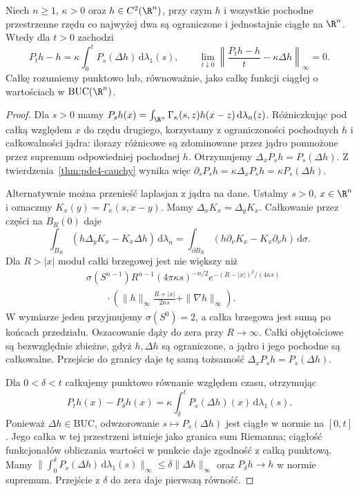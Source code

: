 \begin{lemat}
\label{lem:pde-v31-heat-generator}
Niech $n\geq1$, $\kappa>0$ oraz
$h\in C^2(\R^n)$, przy czym $h$ i wszystkie pochodne
przestrzenne rzędu co najwyżej dwa są ograniczone
i jednostajnie ciągłe na $\R^n$.
Wtedy dla $t>0$ zachodzi
\begin{equation}\label{eq:pde-v31-heat-generator}
 P_th-h=\kappa\int_0^t P_s(\Delta h)\,\mathrm d\lambda_1(s),
 \qquad
 \lim_{t\downarrow0}\left\|\frac{P_th-h}{t}
                 -\kappa\Delta h\right\|_\infty=0.
\end{equation}
Całkę rozumiemy punktowo lub, równoważnie, jako
całkę funkcji ciągłej o wartościach w $\mathrm{BUC}(\R^n)$.
\end{lemat}
\begin{proof}
Dla $s>0$ mamy $P_sh(x)=\int_{\R^n}\Gamma_\kappa(s,z)
h(x-z)\,\mathrm d\lambda_n(z)$. Różniczkując pod
całką względem $x$ do rzędu drugiego, korzystamy
z ograniczoności pochodnych $h$ i całkowalności
jądra: ilorazy różnicowe są zdominowane przez
jądro pomnożone przez supremum odpowiedniej pochodnej $h$.
Otrzymujemy $\Delta_xP_sh=P_s(\Delta h)$.
Z twierdzenia~\ref{thm:pde4-cauchy} wynika więc
$\partial_sP_sh=\kappa\Delta_xP_sh=\kappa P_s(\Delta h)$.

Alternatywnie można przenieść laplasjan z jądra
na dane. Ustalmy $s>0$, $x\in\R^n$ i oznaczmy
$K_x(y)=\Gamma_\kappa(s,x-y)$. Mamy
$\Delta_x K_x=\Delta_y K_x$. Całkowanie przez części
na $B_R(0)$ daje
\[
 \int_{B_R}(h\Delta_y K_x-K_x\Delta h)\,\mathrm d\lambda_n
 =\int_{\partial B_R}(h\partial_\nu K_x-K_x\partial_\nu h)
 \,\mathrm d\sigma.
\]
Dla $R>|x|$ moduł całki brzegowej jest nie większy niż
\[
 \begin{aligned}
 &\sigma(S^{n-1})R^{n-1}(4\pi\kappa s)^{-n/2}
 e^{-(R-|x|)^2/(4\kappa s)}\\
 &\qquad{}\cdot\left(\|h\|_\infty\frac{R+|x|}{2\kappa s}
 +\|\nabla h\|_\infty\right).
 \end{aligned}
\]
W wymiarze jeden przyjmujemy $\sigma(S^0)=2$,
a całka brzegowa jest sumą po końcach przedziału.
Oszacowanie dąży do zera przy $R\to\infty$.
Całki objętościowe są bezwzględnie zbieżne,
gdyż $h,\Delta h$ są ograniczone, a jądro
i jego pochodne są całkowalne. Przejście do granicy
daje tę samą tożsamość $\Delta_xP_sh=P_s(\Delta h)$.

Dla $0<\delta<t$ całkujemy punktowo równanie
względem czasu, otrzymując
\[
 P_th(x)-P_\delta h(x)
 =\kappa\int_\delta^t P_s(\Delta h)(x)\,\mathrm d\lambda_1(s).
\]
Ponieważ $\Delta h\in\mathrm{BUC}$, odwzorowanie
$s\mapsto P_s(\Delta h)$ jest ciągłe w normie
na $[0,t]$. Jego całka w tej przestrzeni istnieje
jako granica sum Riemanna; ciągłość funkcjonałów
obliczania wartości w punkcie daje zgodność z całką
punktową. Mamy
$\|\int_0^\delta P_s(\Delta h)\,\mathrm d\lambda_1(s)\|_\infty
\leq\delta\|\Delta h\|_\infty$ oraz
$P_\delta h\to h$ w normie supremum.
Przejście z $\delta$ do zera daje pierwszą równość.


\end{proof}
